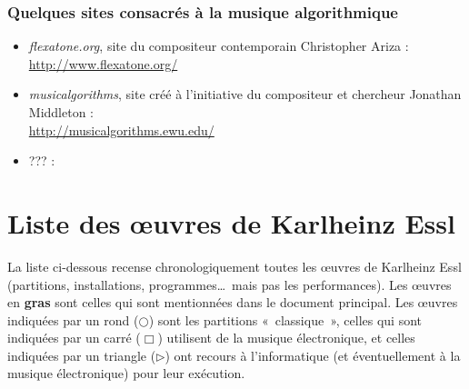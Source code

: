 \documentclass[a4paper,12pt]{article}
\newcommand{\guill}[1]{«~#1~»}
\begin{document}
\subsubsection*{Quelques sites consacrés à la musique algorithmique}

\begin{itemize}
\item \emph{flexatone.org}, site du compositeur contemporain Christopher Ariza : \\ \href{http://www.flexatone.org/}{http://www.flexatone.org/}
\item \emph{musicalgorithms}, site créé à l'initiative du compositeur et chercheur Jonathan Middleton : \\ \href{http://musicalgorithms.ewu.edu/}{http://musicalgorithms.ewu.edu/}
\item ??? : \\ \href{}{}
\end{itemize}

\newpage
\section{Liste des œuvres de Karlheinz Essl}

La liste ci-dessous recense chronologiquement toutes les œuvres de Karlheinz Essl (partitions, installations, programmes\dots~mais pas les performances). Les œuvres en \textbf{gras} sont celles qui sont mentionnées dans le document principal. Les œuvres indiquées par un rond ($\bigcirc$) sont les partitions \guill{classique}, celles qui sont indiquées par un carré ($\Box$) utilisent de la musique électronique, et celles indiquées par un triangle ($\rhd$) ont recours à l'informatique (et éventuellement à la musique électronique) pour leur exécution.
\end{document}
